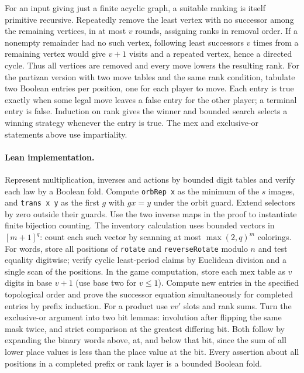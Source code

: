 For an input giving just a finite acyclic graph, a suitable ranking is
itself primitive recursive. Repeatedly remove the least vertex with no
successor among the remaining vertices, in at most $v$ rounds, assigning
ranks in removal order. If a nonempty remainder had no such vertex,
following least successors $v$ times from a remaining vertex would give
$v+1$ visits and a repeated vertex, hence a directed cycle. Thus all
vertices are removed and every move lowers the resulting rank.
For the partizan version with two move tables and the same rank condition,
tabulate two Boolean entries per position, one for each player to move.
Each entry is true exactly when some legal move leaves a false entry for
the other player; a terminal entry is false. Induction on rank gives the
winner and bounded search selects a winning strategy whenever the entry
is true. The mex and exclusive-or statements above use impartiality.

\paragraph{Lean implementation.}
Represent multiplication, inverses and actions by bounded digit tables
and verify each law by a Boolean fold. Compute \texttt{orbRep x} as
the minimum of the $s$ images, and \texttt{trans x y} as the first $g$
with $gx=y$ under the orbit guard. Extend selectors by zero outside their
guards. Use the two inverse maps in the proof to instantiate finite
bijection counting. The inventory calculation uses
bounded vectors in $[m+1]^q$: count each such vector by scanning at most
$\max(2,q)^m$ colorings. For words, store all positions of \texttt{rotate}
and \texttt{reverseRotate} modulo $n$ and test equality digitwise; verify
cyclic least-period claims by Euclidean division and a single scan of the
positions. In the game computation, store each mex table as $v$ digits
in base $v+1$ (use base two for $v\le1$). Compute new entries in the
specified topological order and prove the successor equation simultaneously
for completed entries by prefix induction. For a product use $vv'$ slots
and rank sums. Turn the exclusive-or argument into two bit lemmas:
involution after flipping the same mask twice, and strict comparison at
the greatest differing bit. Both follow by expanding the binary words
above, at, and below that bit, since the sum of all lower place values
is less than the place value at the bit. Every assertion about all
positions in a completed prefix or rank layer is a bounded Boolean fold.
